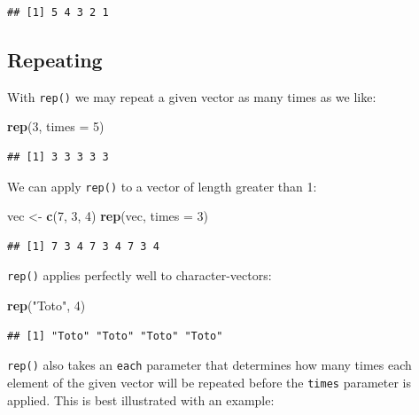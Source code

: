 \documentclass[]{book}
\makeatletter
\newenvironment{Shaded}{\begin{snugshade}}{\end{snugshade}}
\newcommand{\KeywordTok}[1]{\textcolor[rgb]{0.13,0.29,0.53}{\textbf{#1}}}
\newcommand{\DataTypeTok}[1]{\textcolor[rgb]{0.13,0.29,0.53}{#1}}
\newcommand{\DecValTok}[1]{\textcolor[rgb]{0.00,0.00,0.81}{#1}}
\newcommand{\StringTok}[1]{\textcolor[rgb]{0.31,0.60,0.02}{#1}}
\newcommand{\NormalTok}[1]{#1}
\newenvironment{kframe}{%
\medskip{}
\setlength{\fboxsep}{.8em}
 \def\at@end@of@kframe{}%
 \ifinner\ifhmode%
  \def\at@end@of@kframe{\end{minipage}}%
  \begin{minipage}{\columnwidth}%
 \fi\fi%
 \def\FrameCommand##1{\hskip\@totalleftmargin \hskip-\fboxsep
 \colorbox{shadecolor}{##1}\hskip-\fboxsep
     \hskip-\linewidth \hskip-\@totalleftmargin \hskip\columnwidth}%
 \MakeFramed {\advance\hsize-\width
   \@totalleftmargin\z@ \linewidth\hsize
   \@setminipage}}%
 {\par\unskip\endMakeFramed%
 \at@end@of@kframe}
\renewenvironment{Shaded}{\begin{kframe}}{\end{kframe}}
\theoremstyle{definition}
\theoremstyle{definition}
\theoremstyle{definition}
\theoremstyle{remark}
\makeatother
\begin{document}
\begin{verbatim}
## [1] 5 4 3 2 1
\end{verbatim}

\subsection{Repeating}\label{repeating}

With \texttt{rep()} we may
repeat a given vector as many times as we like:

\begin{Shaded}
\begin{Highlighting}[]
\KeywordTok{rep}\NormalTok{(}\DecValTok{3}\NormalTok{, }\DataTypeTok{times =} \DecValTok{5}\NormalTok{)}
\end{Highlighting}
\end{Shaded}

\begin{verbatim}
## [1] 3 3 3 3 3
\end{verbatim}

We can apply \texttt{rep()} to a vector of length greater than 1:

\begin{Shaded}
\begin{Highlighting}[]
\NormalTok{vec <-}\StringTok{ }\KeywordTok{c}\NormalTok{(}\DecValTok{7}\NormalTok{, }\DecValTok{3}\NormalTok{, }\DecValTok{4}\NormalTok{)}
\KeywordTok{rep}\NormalTok{(vec, }\DataTypeTok{times =} \DecValTok{3}\NormalTok{)}
\end{Highlighting}
\end{Shaded}

\begin{verbatim}
## [1] 7 3 4 7 3 4 7 3 4
\end{verbatim}

\texttt{rep()} applies perfectly well to character-vectors:

\begin{Shaded}
\begin{Highlighting}[]
\KeywordTok{rep}\NormalTok{(}\StringTok{"Toto"}\NormalTok{, }\DecValTok{4}\NormalTok{)}
\end{Highlighting}
\end{Shaded}

\begin{verbatim}
## [1] "Toto" "Toto" "Toto" "Toto"
\end{verbatim}

\texttt{rep()} also takes an \texttt{each} parameter that determines how
many times each element of the given vector will be repeated before the
\texttt{times} parameter is applied. This is best illustrated with an
example:
\end{document}
